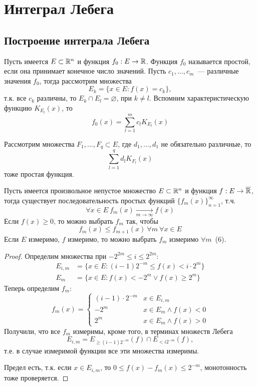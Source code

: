 \documentclass[main]{subfiles}
\begin{document}
\chapter{Интеграл Лебега}
\section{Построение интеграла Лебега}
\begin{definition}
    Пусть имеется $E \subset \mathbb{R}^n$ и функция $f_0:E \to \mathbb{R}$.
    Функция $f_0$ называется простой, если она принимает конечное число значений.
    Пусть $c_1, \dotsc, c_m$~--- различные значения $f_0$, тогда рассмотрим множества
    \[E_k = \{ x \in E: f(x) = c_k\},\]
    т.к. все $c_k$ различны, то $E_k \cap E_l = \varnothing$,  при $k \neq l$.
    Вспомним характеристическую функцию $K_{E_l}(x)$, то
    \[f_0(x) = \sum_{l=1}^{m} c_l K_{E_l}(x)\]
\end{definition}
Рассмотрим множества $F_1, \dotsc, F_q \subset E$, где $d_1, \dotsc, d_1$ не обязательно различные, то
\[\sum_{l=1}^{q} d_l K_{F_l}(x)\]
тоже простая функция.

\begin{theorem}
    Пусть имеется произвольное непустое множество $E \subset \mathbb{R}^n$ и функция $f: E \to \overline{\mathbb{R}}$, тогда существует последовательность простых функций $\{f_m(x)\}_{n=1}^\infty$, т.ч.
    \[\forall x \in E\ f_m(x) \xrightarrow[m \to \infty]{} f(x) \tag{4}\]
    Если $f(x) \ge 0$, то можно выбрать $f_m$ так, чтобы
    \[f_m(x) \le f_{m+1}(x)\ \forall m\ \forall x \in E \tag{5}\]
    Если $E$ измеримо, $f$ измеримо, то можно выбрать $f_m$ измеримо $\forall m$~(6).
\end{theorem}
\begin{proof}
    Определим множества при $-2^{2m} \le i \le 2^{2m}$:
    \begin{align*}
        E_{i,m} & = \{x \in E: (i-1) 2^{-m} \le f(x) < i \cdot 2^m\} \\
        E_m     & = \{x \in E: f(x) < -2^m \lor f(x) \ge 2^m\}
    \end{align*}
    Теперь определим $f_m$:
    \[f_m (x) = \begin{cases}
            (i-1) \cdot 2^{-m} & x \in E_{i,m}            \\
            -2^m               & x \in E_m \land f(x) < 0 \\
            2^m                & x \in E_m \land f(x) > 0
        \end{cases}\]
    Получили, что все $f_m$ измеримы, кроме того, в терминах множеств Лебега
    \[E_{i,m} = E_{\ge (i-1) 2^{-m}} (f) \cap E_{< i 2^{-m}}(f),\]
    т.е. в случае измеримой функции все эти множества измеримы.

    Предел есть, т.к. если $x \in E_{i,m}$, то $0 \le f(x) - f_m(x) \le 2^{-m}$, монотонность тоже проверяется.
\end{proof}
\end{document}
